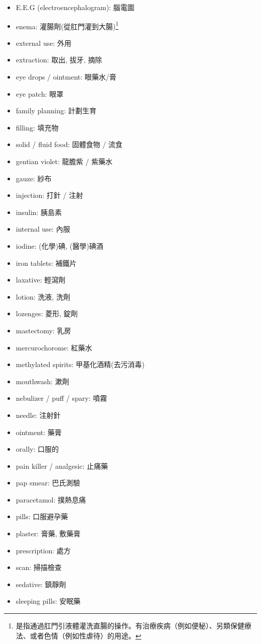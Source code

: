 \begin{multicols}{2}
\begin{itemize}
  \item E.E.G (electroencephalogram): 腦電圖
  \item enema: 灌腸劑(從肛門灌到大腸)\footnote{是指通過肛門引液體灌洗直腸的操作。有治療疾病（例如便秘）、另類保健療法、或者色情（例如性虐待）的用途。}
  \item external use: 外用
  \item extraction: 取出, 拔牙, 摘除
  \item eye drops / ointment: 眼藥水/膏
  \item eye patch: 眼罩
  \item family planning: 計劃生育
  \item filling: 填充物
  \item solid / fluid food: 固體食物 / 流食
  \item gentian violet: 龍膽紫 / 紫藥水
  \item gauze: 紗布
  \item injection: 打針 / 注射
  \item insulin: 胰島素
  \item internal use: 內服
  \item iodine: (化學)碘, (醫學)碘酒
  \item iron tablets: 補鐵片
  \item laxative: 輕瀉劑
  \item lotion: 洗液, 洗劑
  \item lozenges: 菱形, 錠劑
  \item mastectomy: 乳房
  \item mercurochorome: 紅藥水
  \item methylated spirits: 甲基化酒精(去污消毒)
  \item mouthwash: 漱劑
  \item nebulizer / puff / spary: 噴霧
  \item needle: 注射針
  \item ointment: 藥膏
  \item orally: 口服的
  \item pain killer / analgesic: 止痛藥
  \item pap smear: 巴氏測驗
  \item paracetamol: 撲熱息痛
  \item pills: 口服避孕藥
  \item plaster: 膏藥, 敷藥膏
  \item prescription: 處方
  \item scan: 掃描檢查
  \item sedative: 鎮靜劑
  \item sleeping pills: 安眠藥

\end{itemize}
\end{multicols}
